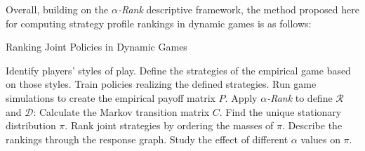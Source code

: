 \begin{flushleft}
\begin{flushleft}
        Overall, building on the \emph{$\alpha$-Rank} descriptive framework, the method proposed here for computing strategy profile rankings in dynamic games is as follows:
        \begin{algorithm}
            \caption{Ranking Joint Policies in Dynamic Games}
            \begin{algorithmic}[1]
                \vspace{0.5em}
                \STATE Identify players' styles of play.
                \STATE Define the strategies of the empirical game based on those styles.
                \STATE Train policies realizing the defined strategies.
                \STATE Run game simulations to create the empirical payoff matrix $P$.
                \STATE Apply \emph{$\alpha$-Rank} to define $\mathcal{R}$ and $\mathcal{D}$:
                \vspace{0.5em}
                \STATE \hspace{1em} Calculate the Markov transition matrix $C$.
                \STATE \hspace{1em} Find the unique stationary distribution $\pi$.
                \STATE \hspace{1em} Rank joint strategies by ordering the masses of $\pi$.
                \STATE \hspace{1em} Describe the rankings through the response graph.
                \STATE \hspace{1em} Study the effect of different $\alpha$ values on $\pi$.
            \end{algorithmic}
        \end{algorithm}

    \end{flushleft}

\end{flushleft}